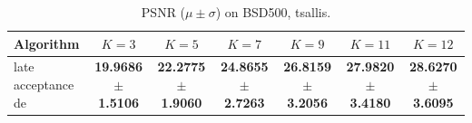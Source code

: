 \begin{table}[htbp]
\centering
\caption{PSNR ($\mu \pm \sigma$) on BSD500, tsallis.}
\label{tab:exp1-tsallis-psnr}
\begin{tabular}{lcccccc}
\toprule
Algorithm & $K=3$ & $K=5$ & $K=7$ & $K=9$ & $K=11$ & $K=12$ \\
\midrule
late acceptance de & \textbf{19.9686 $\pm$ 1.5106} & \textbf{22.2775 $\pm$ 1.9060} & \textbf{24.8655 $\pm$ 2.7263} & \textbf{26.8159 $\pm$ 3.2056} & \textbf{27.9820 $\pm$ 3.4180} & \textbf{28.6270 $\pm$ 3.6095} \\
\bottomrule
\end{tabular}
\end{table}